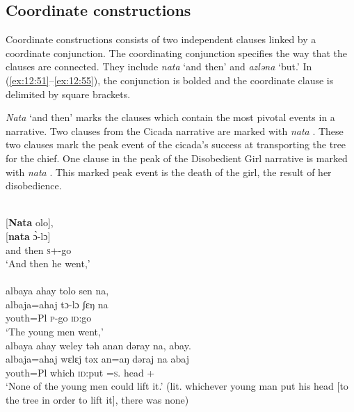 \subsection{Coordinate constructions}\label{sec:12.3.3}
\hypertarget{RefHeading1213481525720847}{}
\largerpage
Coordinate constructions consists of two independent clauses linked by a coordinate conjunction. The coordinating conjunction specifies the way that the clauses are connected. They include \textit{nata} ‘and then’ and \textit{azləna} ‘but.’ In (\ref{ex:12:51}--\ref{ex:12:55}), the conjunction is bolded and the coordinate clause is delimited by square brackets. 

\textit{Nata} ‘and then’ marks the clauses which contain the most pivotal events in a narrative. Two clauses from the Cicada narrative are marked with \textit{nata} . These two clauses mark the peak event of the cicada’s success at transporting the tree for the chief. One clause in the peak of the Disobedient Girl narrative is marked with \textit{nata} . This marked peak event is the death of the girl, the result of her disobedience. 

\ea \label{ex:12:51}\\
{}[\textbf{Nata}  olo],\\ 
\gll  {}[\textbf{nata} \`{ɔ}-lɔ] \\ 
      {and then}     \textsc{s}+{\PFV}-go \\ 
\glt  ‘And then he went,’ \\

\medskip
{}\\
albaya  ahay  tolo  sen  na,\\ 
\gll albaja=ahaj tɔ-lɔ ʃɛŋ na\\ 
     youth=Pl \textsc{p}-go \textsc{id}:go {\PSP}\\ 
\glt ‘The young men went,’\\

\medskip
albaya  ahay  weley  təh  anan  dəray  na,  abay.\\  
\gll albaja=ahaj wɛlɛj təx an=aŋ dəraj na abaj\\
     youth=Pl which \textsc{id}:put   {\DAT}=\textsc{s}.{\IO}   head   {\PSP}   {{\EXT}+{\NEG}} \\
\glt ‘None of the young men could lift it.’ (lit. whichever young man put his head [to the tree in order to lift it], there was none) \\


